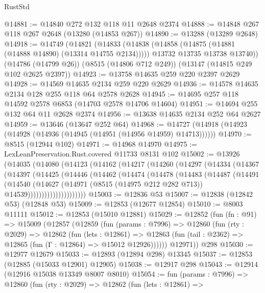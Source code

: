 \begin{lexlean}{RustStd}
\begin{coremodule}
@14881 := @14840 @272 @132 @118 @11 @2648 @2374
@14888 := @14848 @267 @118 @267 @2648 (@13280 (@14853 @267))
@14890 := @13288 (@13289 @2648)
@14918 := @14749
    (@14821
      (@14833
        (@14838 (@14858 (@14875 (@14881 (@14888 @14890) (@13314 @14755 @2134)))))
        @13732
        @13735
        @13738
        @13740))
    (@14786 (@14799 @26))
    (@8515 (@14806 @712 @249))
    (@13147 (@14815 @249 @102 @2625 @2397))
@14923 := @13758 @14635 @259 @220 @2397 @2629
@14928 := @14569 @14635 @2134 @259 @220 @2629
@14936 := @14578 @14635 @2134 @128 @255 @118 @64 @2578 @2628
@14945 := @14695 @257 @118 @14592 @2578 @6853 (@14703 @2578 @14706 @14604)
@14951 := @14694 @255 @132 @64 @11 @2628 @2374
@14956 := @13638 @14635 @2134 @252 @64 @2627
@14959 := @13646 (@13647 @252 @64)
@14968 := @14727 (@14918 (@14923 (@14928 (@14936 (@14945 (@14951 (@14956 @14959) @14713))))))
@14970 := @8515 (@12944 @102)
@14971 := @14968 @14970
@14975 := LexLeanPreservation.Rust.covered @11733 @8131 @102
@15002 := @13926
    (@14035
      (@14080
        (@14123
          (@14162
            (@14217
              (@14260
                (@14297
                  (@14334
                    (@14367
                      (@14397
                        (@14425
                          (@14446
                            (@14462
                              (@14474
                                (@14478
                                  (@14483
                                    (@14487
                                      (@14491
                                        (@14540
                                          (@14627
                                            (@14971
                                              (@8515 (@14975 @212 @282 @713))
                                              @14539)))))))))))))))))))))
@15003 := @12836 @53
@15007 := @12838 (@12842 @53) (@12848 @53)
@15009 := @12853 (@12677 @12854)
@15010 := @8003 @11111
@15012 := @12853 (@15010 @12881)
@15029 := @12852
    (fun (fn : @91) =>
    @15009
      (@12857
        (@12859
          (fun (params : @7996) =>
          @12860
            (fun (rty : @2029) =>
            @12862
              (fun (lets : @12861) =>
              @12863 (fun (tail : @2362) => @12865 (fun (Γ : @12864) => @15012 @12926))))))
        @12971))
    @298
@15030 := @12977 @12679
@15033 := @12893 (@12894 @298) @13345
@15037 := @12853 (@12885 (@15033 @12901) @12905)
@15038 := @12917 @298
@15043 := @12914 (@12916 @15038 @13349 @8007 @8010)
@15054 := fun (params : @7996) =>
  @12860
    (fun (rty : @2029) =>
    @12862
      (fun (lets : @12861) =>

\end{coremodule}
\end{lexlean}
